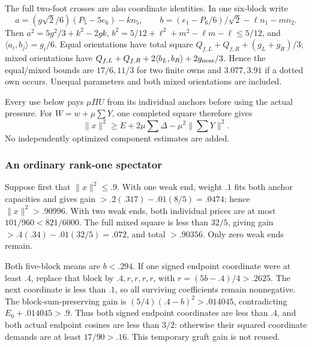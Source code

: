\documentclass[11pt]{article}
\theoremstyle{definition}
\theoremstyle{remark}
\newcommand{\ip}[2]{\langle #1,#2\rangle}
\newcommand{\norm}[1]{\lVert #1\rVert}
\begin{document}
The full two-foot crosses are also coordinate identities. In one
six-block write
\[
 a=(g\sqrt2/6)(P_5-5e_6)-k n_5,\qquad
 b=(e_1-P_6/6)/\sqrt2-\ell n_1-m n_2.
\]
Then \(a^2=5g^2/3+k^2-2gk\),
\(b^2=5/12+\ell^2+m^2-\ell m-\ell\le5/12\), and
\(\ip{a_i}{b_j}=g_i/6\). Equal orientations have total square
\(Q_{f,L}+Q_{f,R}+(g_L+g_R)/3\); mixed orientations have
\(Q_{f,L}+Q_{f,R}+2\ip{b_L}{b_R}+2g_{\rm near}/3\).
Hence the equal/mixed bounds are \(17/6,11/3\) for two finite
owns and \(3.077,3.91\) if a dotted own occurs. Unequal
parameters and both mixed orientations are included.

Every use below pays \(\mu\Pi U\) from its individual anchors
before using the actual pressure. For \(W=w+\mu\sum Y\), one
completed square therefore gives
\[
 \norm x^2\ge E+2\mu\sum\Delta-\mu^2\norm{\textstyle\sum Y}^2.
\]
No independently optimized component estimates are added.

\subsubsection{An ordinary rank-one spectator}
Suppose first that \(\norm x^2\le.9\). With one weak end,
weight \(.1\) fits both anchor capacities and gives gain
\(>.2(.317)-.01(8/5)=.0474\); hence
\(\norm x^2>.90996\). With two weak ends, both individual
prices are at most \(101/960<821/6000\). The full mixed square
is less than \(32/5\), giving gain
\(>.4(.34)-.01(32/5)=.072\), and total \(>.90356\).
Only zero weak ends remain.

Both five-block means are \(b<.294\). If one signed endpoint
coordinate were at least \(.4\), replace that block by
\(.4,r,r,r,r\), with \(r=(5b-.4)/4>.2625\).
The next coordinate is less than \(.1\), so all surviving
coefficients remain nonnegative. The block-sum-preserving gain is
\((5/4)(.4-b)^2>.014045\), contradicting
\(E_0+.014045>.9\). Thus both signed endpoint coordinates
are less than \(.4\), and both actual endpoint cosines are less
than \(3/2\): otherwise their squared coordinate demands are
at least \(17/90>.16\). This temporary graft gain is not reused.
\end{document}
